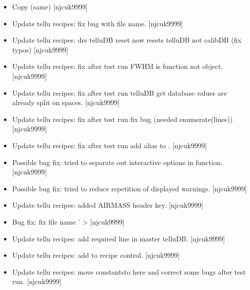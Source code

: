 \documentclass[a4paper,10pt,english]{report}
\begin{document}
\label{\detokenize{misc/changelog:id410}}\begin{itemize}
\item {} 
Copy (same) {[}njcuk9999{]}

\item {} 
Update tellu recipes: fix bug with file name. {[}njcuk9999{]}

\item {} 
Update tellu recipes: drs telluDB reset now resets telluDB not calibDB
(fix typos) {[}njcuk9999{]}

\item {} 
Update tellu recipes: fix after test run FWHM is function not object.
{[}njcuk9999{]}

\item {} 
Update tellu recipes: fix after test run \sphinxhyphen{} telluDB get database values
are already split on spaces. {[}njcuk9999{]}

\item {} 
Update tellu recipes: fix after test run \sphinxhyphen{} fix bug (needed
enumerate(lines)) {[}njcuk9999{]}

\item {} 
Update tellu recipes: fix after test run \sphinxhyphen{} add alias to
. {[}njcuk9999{]}

\item {} 
Possible bug fix: tried to separate out interactive options in
 function. {[}njcuk9999{]}

\item {} 
Possible bug fix: tried to reduce repetition of displayed warnings.
{[}njcuk9999{]}

\item {} 
Update tellu recipes: added AIRMASS header key. {[}njcuk9999{]}

\item {} 
Bug fix: fix file name ’ \textendash{}\textgreater{}
 {[}njcuk9999{]}

\item {} 
Update tellu recipes: add required line in master telluDB. {[}njcuk9999{]}

\item {} 
Update tellu recipes: add  to recipe control.
{[}njcuk9999{]}

\item {} 
Update tellu recipes: move  constantsto here and
correct some bugs after test run. {[}njcuk9999{]}


\end{itemize}
\end{document}
